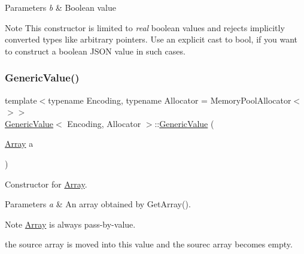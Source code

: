 \begin{DoxyParams}{Parameters}
{\em b} & Boolean value \\
\hline
\end{DoxyParams}
\begin{DoxyNote}{Note}
This constructor is limited to {\itshape real} boolean values and rejects implicitly converted types like arbitrary pointers. Use an explicit cast to {\ttfamily bool}, if you want to construct a boolean J\+S\+ON value in such cases. 
\end{DoxyNote}
\mbox{\label{classGenericValue_a953052ef91e54aabe9bdb9f9eaebf6cc}} 
\subsubsection{\texorpdfstring{Generic\+Value()}{GenericValue()}\hspace{0.1cm}{\footnotesize\ttfamily [7/8]}}
{\footnotesize\ttfamily template$<$typename Encoding, typename Allocator = Memory\+Pool\+Allocator$<$$>$$>$ \\
\hyperlink{classGenericValue}{Generic\+Value}$<$ Encoding, Allocator $>$\+::\hyperlink{classGenericValue}{Generic\+Value} (\begin{DoxyParamCaption}\item[{\hyperlink{structGenericValue_1_1Array}{Array}}]{a }\end{DoxyParamCaption})\hspace{0.3cm}{\ttfamily [inline]}}



Constructor for \hyperlink{structGenericValue_1_1Array}{Array}. 


\begin{DoxyParams}{Parameters}
{\em a} & An array obtained by {\ttfamily Get\+Array()}. \\
\hline
\end{DoxyParams}
\begin{DoxyNote}{Note}
{\ttfamily \hyperlink{structGenericValue_1_1Array}{Array}} is always pass-\/by-\/value. 

the source array is moved into this value and the sourec array becomes empty. 
\end{DoxyNote}
\mbox{\label{classGenericValue_a9c294e56f4ab940f845f7c171b183483}} 
